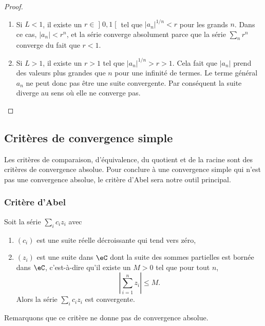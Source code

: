 \begin{proof}
	\begin{enumerate}
		\item
		      Si \( L<1\), il existe un \( r\in \mathopen] 0 , 1 \mathclose[\) tel que \( | a_n |^{1/n}<r\) pour les grands \( n\). Dans ce cas, \( | a_n |<r^{n}\), et la série converge absolument parce que la série \( \sum_nr^n\) converge du fait que \( r<1\).
		\item
		      Si \( L>1\), il existe un \( r>1\) tel que \( | a_n |^{1/n}>r>1\). Cela fait que \( | a_n |\) prend des valeurs plus grandes que \( n\) pour une infinité de termes. Le terme général \( a_n\) ne peut donc pas être une suite convergente. Par conséquent la suite diverge au sens où elle ne converge pas.

	\end{enumerate}
\end{proof}

\subsection{Critères de convergence simple}

Les critères de comparaison, d'équivalence, du quotient et de la racine sont des critères de convergence absolue. Pour conclure à une convergence simple qui n'est pas une convergence absolue, le critère d'Abel sera notre outil principal.

\subsubsection{Critère d'Abel}

\begin{proposition}
	Soit la série \( \sum_i c_iz_i\) avec
	\begin{enumerate}
		\item \( (c_i)\) est une suite réelle décroissante qui tend vers zéro,
		\item \( (z_i)\) est une suite dans \( \eC\) dont la suite des sommes partielles est bornée dans \( \eC\), c'est-à-dire qu'il existe un \( M>0\) tel que pour tout \( n\),
		      \begin{equation}
			      \left| \sum_{i=1}^nz_i \right| \leq M.
		      \end{equation}
		      Alors la série \( \sum_ic_iz_i\) est convergente.
	\end{enumerate}
\end{proposition}
Remarquons que ce critère ne donne pas de convergence absolue.

